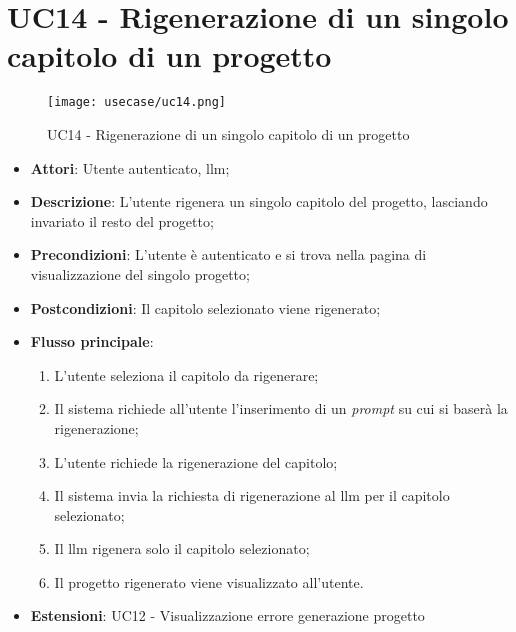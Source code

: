 \section*{UC14 - Rigenerazione di un singolo capitolo di un progetto}
\begin{figure}[H]
    \centering
    \texttt{[image: usecase/uc14.png]}
    \caption{UC14 - Rigenerazione di un singolo capitolo di un progetto}
    \label{fig:uc14}
\end{figure}
\begin{itemize}
    \item \textbf{Attori}: Utente autenticato, \gls{llm};
    \item \textbf{Descrizione}: L'utente rigenera un singolo capitolo del progetto, lasciando invariato il resto del progetto;
    \item \textbf{Precondizioni}: L'utente è autenticato e si trova nella pagina di visualizzazione del singolo progetto;
    \item \textbf{Postcondizioni}: Il capitolo selezionato viene rigenerato;
    \item \textbf{Flusso principale}:
    \begin{enumerate}
        \item L'utente seleziona il capitolo da rigenerare;
        \item Il sistema richiede all’utente l’inserimento di un \textit{prompt} su cui si baserà la rigenerazione;
        \item L’utente richiede la rigenerazione del capitolo;
        \item Il sistema invia la richiesta di rigenerazione al \gls{llm} per il capitolo selezionato;
        \item Il \gls{llm} rigenera solo il capitolo selezionato;
        \item Il progetto rigenerato viene visualizzato all'utente.
    \end{enumerate}
    \item \textbf{Estensioni}: UC12 - Visualizzazione errore generazione progetto
\end{itemize}

\vspace{0.5cm}  
